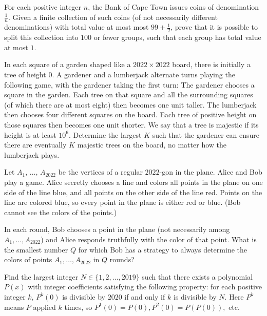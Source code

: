 \documentclass[11pt]{scrartcl}
\begin{document}
\begin{problem}[944096417683669]
For each positive integer $n$, the Bank of Cape Town issues coins of denomination $\frac1n$. Given a finite collection of such coins (of not necessarily different denominations) with total value at most most $99+\frac12$, prove that it is possible to split this collection into $100$ or fewer groups, such that each group has total value at most $1$.
\end{problem}
\begin{problem}[8799177804774743019]
In each square of a garden shaped like a $2022 \times 2022$ board, there is initially a tree of height $0$. A gardener and a lumberjack alternate turns playing the following game, with the gardener taking the first turn:
The gardener chooses a square in the garden. Each tree on that square and all the surrounding squares (of which there are at most eight) then becomes one unit taller.
The lumberjack then chooses four different squares on the board. Each tree of positive height on those squares then becomes one unit shorter.
We say that a tree is majestic if its height is at least $10^6$. Determine the largest $K$ such that the gardener can ensure there are eventually $K$ majestic trees on the board, no matter how the lumberjack plays.
\end{problem}
\begin{problem}[836212333854709]
	Let $A_1$, $\ldots$, $A_{2022}$ be the vertices of a regular $2022$-gon in the plane. Alice and Bob play a game. Alice secretly chooses a line and colors all points in the plane on one side of the line blue, and all points on the other side of the line red. Points on the line are colored blue, so every point in the plane is either red or blue. (Bob cannot see the colors of the points.)

In each round, Bob chooses a point in the plane (not necessarily among $A_1, \ldots, A_{2022}$) and Alice responds truthfully with the color of that point. What is the smallest number $Q$ for which Bob has a strategy to always determine the colors of points $A_1, \ldots, A_{2022}$ in $Q$ rounds?
\end{problem}
\begin{problem}[4037864050528368034]
Find the largest integer $N \in \{1, 2, \ldots , 2019 \}$ such that there exists a polynomial $P(x)$ with integer coefficients satisfying the following property: for each positive integer $k$, $P^k(0)$ is divisible by $2020$ if and only if $k$ is divisible by $N$. Here $P^k$ means $P$ applied $k$ times, so $P^1(0)=P(0), P^2(0)=P(P(0)),$ etc.
\end{problem}
\end{document}
